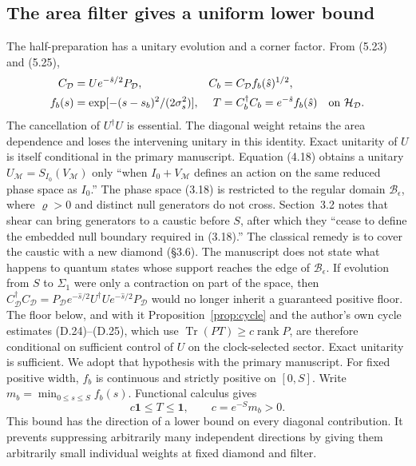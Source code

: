 \documentclass[11pt]{article}
\newcommand{\Tr}{\operatorname{Tr}}
\newcommand{\id}{\mathbf{1}}
\newcommand{\HH}{\mathcal H_{\mathcal D}}
\newcommand{\areaop}{\hat s}
\newcommand{\cD}{C_{\mathcal D}}
\DeclareMathOperator{\rank}{rank}
\begin{document}
\subsection{The area filter gives a uniform lower bound}
The half-preparation has a unitary evolution and a corner factor. From (5.23) and (5.25),
\begin{align}
\cD&=U e^{-\areaop/2}P_{\mathcal D},&
C_b&=\cD f_b(\areaop)^{1/2},\\
f_b(s)&=\exp[-(s-s_b)^2/(2\sigma_s^2)],&
T&=C_b^\dagger C_b=e^{-\areaop}f_b(\areaop)\quad\hbox{on }\HH .
\end{align}
The cancellation of $U^\dagger U$ is essential. The diagonal weight retains the area dependence and loses the intervening unitary in this identity. Exact unitarity of $U$ is itself conditional in the primary manuscript. Equation (4.18) obtains a unitary $U_{\mathcal M}=S_{I_0}(V_{\mathcal M})$ only ``when $I_0+V_{\mathcal M}$ defines an action on the same reduced phase space as $I_0$.'' The phase space (3.18) is restricted to the regular domain $\mathcal B_\epsilon$, where $\varrho>0$ and distinct null generators do not cross. Section~3.2 notes that shear can bring generators to a caustic before $S$, after which they ``cease to define the embedded null boundary required in (3.18).'' The classical remedy is to cover the caustic with a new diamond (\S3.6). The manuscript does not state what happens to quantum states whose support reaches the edge of $\mathcal B_\epsilon$. If evolution from $S$ to $\Sigma_1$ were only a contraction on part of the space, then $C_{\mathcal D}^\dagger C_{\mathcal D}=P_{\mathcal D}e^{-\areaop/2}U^\dagger Ue^{-\areaop/2}P_{\mathcal D}$ would no longer inherit a guaranteed positive floor. The floor below, and with it Proposition~\ref{prop:cycle} and the author's own cycle estimates (D.24)--(D.25), which use $\Tr(PT)\ge c\rank P$, are therefore conditional on sufficient control of $U$ on the clock-selected sector. Exact unitarity is sufficient. We adopt that hypothesis with the primary manuscript. For fixed positive width, $f_b$ is continuous and strictly positive on $[0,S]$. Write $m_b=\min_{0\le s\le S} f_b(s)$. Functional calculus gives
\begin{equation}\label{eq:floor}
c\id\le T\le\id,\qquad c=e^{-S}m_b>0 .
\end{equation}
This bound has the direction of a lower bound on every diagonal contribution. It prevents suppressing arbitrarily many independent directions by giving them arbitrarily small individual weights at fixed diamond and filter.
\end{document}
